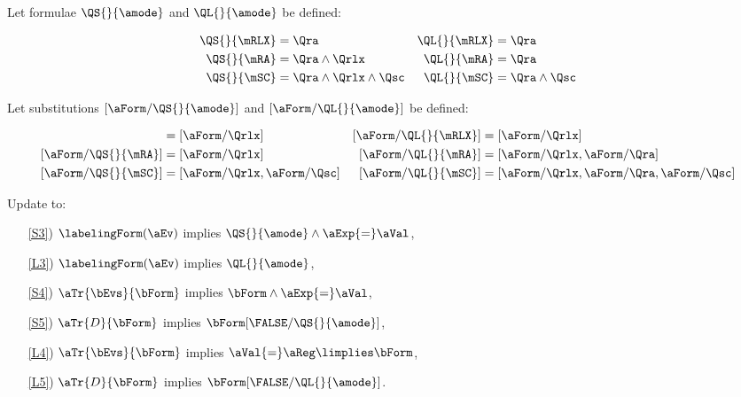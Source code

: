 \begin{definition}
  Let formulae $\QS{}{\amode}$ and $\QL{}{\amode}$ be defined:
  \begin{scope}
    \small
    \begin{align*}
      \QS{}{\mRLX}&=\Qra
      &\QL{}{\mRLX}&=\Qra
      \\
      \QS{}{\mRA}&=\Qra\land\Qrlx
      &\QL{}{\mRA}&=\Qra
      \\
      \QS{}{\mSC}&=\Qra\land \Qrlx \land \Qsc
      &\QL{}{\mSC}&=\Qra\land\Qsc
    \end{align*}
  \end{scope}
  Let substitutions $[\aForm/\QS{}{\amode}]$ and  $[\aForm/\QL{}{\amode}]$ be defined:
  \begin{scope}
    \small
    \begin{align*}
      [\aForm/\QS{}{\mRLX}] &= [\aForm/\Qrlx]
      &{} [\aForm/\QL{}{\mRLX}] &= [\aForm/\Qrlx]
      \\
      [\aForm/\QS{}{\mRA}] &= [\aForm/\Qrlx]
      &{} [\aForm/\QL{}{\mRA}] &= [\aForm/\Qrlx,\aForm/\Qra]
      \\
      [\aForm/\QS{}{\mSC}] &= [\aForm/\Qrlx,\aForm/\Qsc]
      &{} [\aForm/\QL{}{\mSC}] &= [\aForm/\Qrlx,\aForm/\Qra,\aForm/\Qsc]
    \end{align*}
  \end{scope}
\end{definition}
\begin{definition}%
  Update  to: %
  \begin{enumerate}
  \item[\ref{S3})]
    $\labelingForm(\aEv)$ implies $\QS{}{\amode}\land\aExp{=}\aVal$,
  \item[\ref{L3})]
    $\labelingForm(\aEv)$ implies $\QL{}{\amode}$,
  \end{enumerate}
  \begin{enumerate}
  \item[\ref{S4})]
    $\aTr{\bEvs}{\bForm}$ implies $\bForm \land\aExp{=}\aVal$,
  \item[\ref{S5})]
    $\aTr{\cEvs}{\bForm}$ implies $\bForm[\FALSE/\QS{}{\amode}]$,
  \item[\ref{L4})]
    $\aTr{\bEvs}{\bForm}$ implies $\aVal{=}\aReg\limplies\bForm$, 
  \item[\ref{L5})]
    $\aTr{\cEvs}{\bForm}$ implies $\bForm[\FALSE/\QL{}{\amode}]$.
  \end{enumerate}
\end{definition}

